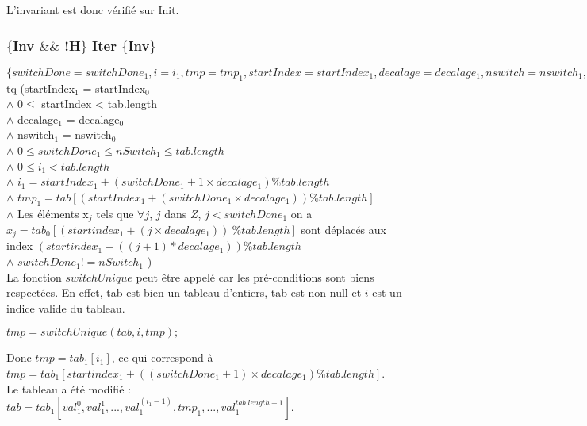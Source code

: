 L'invariant est donc vérifié sur Init.

\subsubsection*{$\{$Inv $\&\&$ !H$\}$ Iter $\{$Inv$\}$}

$\{ switchDone = switchDone_{1}, i = i_{1}, tmp = tmp_{1}, startIndex = startIndex_{1}, decalage = decalage_{1}, nswitch = nswitch_{1}, tab = tab_{1} \}$ tq (startIndex$_{1}$ = startIndex$_{0}$\\
$\wedge$ $0 \leq$ startIndex < tab.length \\
$\wedge$ decalage$_{1}$ = decalage$_{0}$\\
$\wedge$ nswitch$_{1}$ = nswitch$_{0}$\\
$\wedge$ $0\leq switchDone_{1} \leq nSwitch_{1} \leq tab.length$\\
$\wedge$ $0\leq i_{1} < tab.length$\\
$\wedge$ $i_{1} = startIndex_{1} + (switchDone_{1}+1\times decalage_{1}) \% tab.length$\\
$\wedge$ $tmp_{1} = tab[(startIndex_{1} + (switchDone_{1}\times decalage_{1}))  \% tab.length]$\\
$\wedge$ Les éléments x$_{j}$ tels que $\forall j$, $j$ dans $Z$, $j<switchDone_{1}$ on a $x_{j}=tab_{0}[(startindex_{1} + (j\times decalage_{1}))\ \% tab.length]$ sont déplacés aux index $(startindex_{1} + ((j+1)* decalage_{1}))\%tab.length$\\
$\wedge$ $switchDone_{1} != nSwitch_{1}$ )\\

La fonction $switchUnique$ peut être appelé car les pré-conditions sont biens respectées. En effet, tab est bien un tableau d'entiers, tab est non null et $i$ est un indice valide du tableau. \\

\begin{center}
$tmp = switchUnique(tab, i, tmp);$\\
\end{center}

Donc $tmp = tab_{1}[i_1]$, ce qui correspond à $tmp = tab_{1}[startindex_{1} + ((switchDone_{1}+1)\times decalage_{1}) \% tab.length]$.\\

Le tableau a été modifié : $tab = tab_{1}[val_{1}^{0},val_{1}^{1}, ..., val_{1}^{(i_{1}-1)}, tmp_{1}, ...,val_{1}^{tab.length-1}]$.\\

